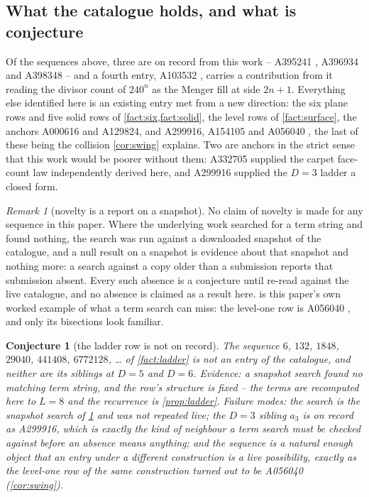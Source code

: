 \documentclass[11pt]{amsart}
\newtheorem{conjecture}[theorem]{Conjecture}
\theoremstyle{definition}
\theoremstyle{remark}
\newtheorem{remark}[theorem]{Remark}
\begin{document}
\subsection*{What the catalogue holds, and what is conjecture}

Of the sequences above, three are on record from this work -- A395241 \cite{a395241}, A396934 \cite{a396934} and A398348 \cite{a398348} -- and a fourth entry, A103532 \cite{a103532}, carries a contribution from it reading the divisor count of $240^{n}$ as the Menger fill at side $2n+1$. Everything else identified here is an existing entry met from a new direction: the six plane rows and five solid rows of \cref{fact:six,fact:solid}, the level rows of \cref{fact:surface}, the anchors A000616 and A129824, and A299916, A154105 and A056040 \cite{a056040}, the last of these being the collision \cref{cor:swing} explains. Two are anchors in the strict sense that this work would be poorer without them: A332705 supplied the carpet face-count law independently derived here, and A299916 supplied the $D=3$ ladder a closed form.

\begin{remark}[novelty is a report on a snapshot]
\label{rem:dump}
No claim of novelty is made for any sequence in this paper. Where the underlying work searched for a term string and found nothing, the search was run against a downloaded snapshot of the catalogue, and a null result on a snapshot is evidence about that snapshot and nothing more: a search against a copy older than a submission reports that submission absent. Every such absence is a conjecture until re-read against the live catalogue, and no absence is claimed as a result here.  is this paper's own worked example of what a term search can miss: the level-one row is A056040 \cite{a056040}, and only its bisections look familiar.
\end{remark}

\begin{conjecture}[the ladder row is not on record]
\label{con:ladder}
The sequence $6$, $132$, $1848$, $29040$, $441408$, $6772128$, \dots{} of \cref{fact:ladder} is not an entry of the catalogue, and neither are its siblings at $D = 5$ and $D = 6$. \emph{Evidence:} a snapshot search found no matching term string, and the row's structure is fixed -- the terms are recomputed here to $L = 8$ and the recurrence is \cref{prop:ladder}. \emph{Failure modes:} the search is the snapshot search of \cref{rem:dump} and was not repeated live; the $D=3$ sibling $a_{3}$ \emph{is} on record as A299916, which is exactly the kind of neighbour a term search must be checked against before an absence means anything; and the sequence is a natural enough object that an entry under a different construction is a live possibility, exactly as the level-one row of the same construction turned out to be A056040 (\cref{cor:swing}).
\end{conjecture}
\end{document}
